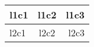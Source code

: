 \documentclass{article}
\begin{document}
\begin{table}[!htp]
	\begin{tabular}{|l|c|r|}
		\hline
		l1c1 & l1c2 & l1c3 \\
		\hline 
		l2c1 & l2c2 & l2c3 \\
		\hline
	\end{tabular}
\end{table}
\end{document}
